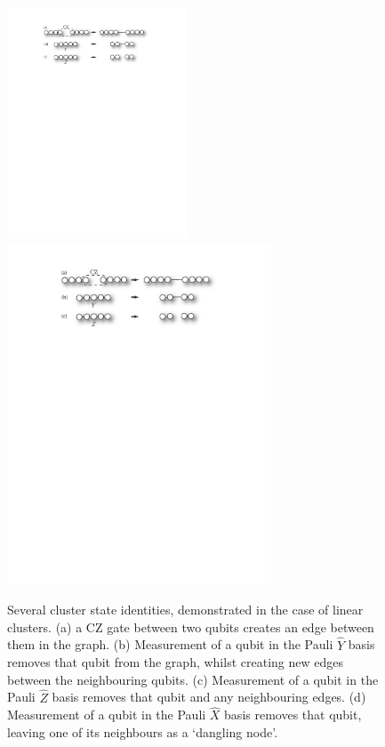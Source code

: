 \begin{figure}[!htbp]
\pubmode
	\includegraphics[clip=true, width=0.475\textwidth]{cluster_identities} 
\else
	\includegraphics[clip=true, width=0.7\textwidth]{cluster_identities} 
\fi
	\captionspacefig \caption{Several cluster state identities, demonstrated in the case of linear clusters. (a) a CZ gate between two qubits creates an edge between them in the graph. (b) Measurement of a qubit in the Pauli $\hat{Y}$ basis removes that qubit from the graph, whilst creating new edges between the neighbouring qubits. (c) Measurement of a qubit in the Pauli $\hat{Z}$ basis removes that qubit and any neighbouring edges. (d) Measurement of a qubit in the Pauli $\hat{X}$ basis removes that qubit, leaving one of its neighbours as a `dangling node'.} \label{fig:cluster_ident} 
\end{figure}

